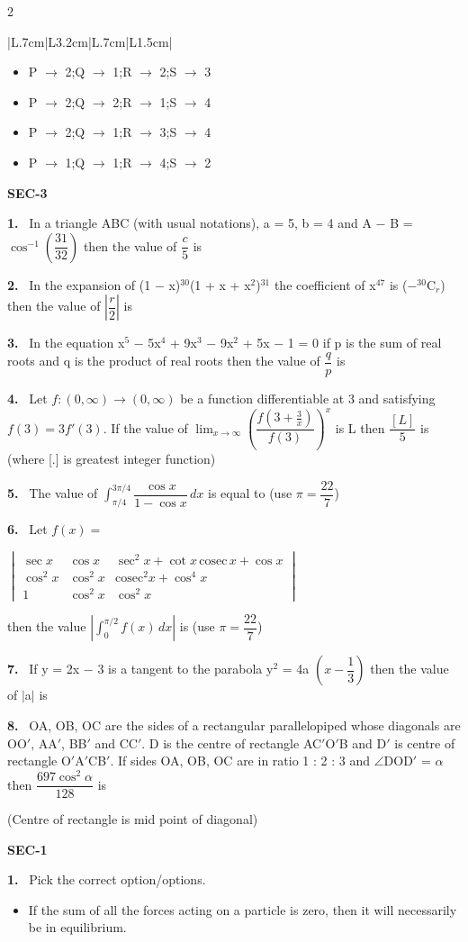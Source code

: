 \documentclass[10pt]{extarticle}
\newcommand{\papersec}[1]{\par\bigskip{\centering\Large\bfseries PAPER-#1\par}\medskip}
\newcommand{\partsec}[2]{\par\medskip\noindent{\large\bfseries PART-#1: #2}\par\smallskip}
\newcommand{\sect}[1]{\par\smallskip\noindent\textbf{#1}\par}
\newcommand{\qn}[1]{\par\smallskip\noindent\textbf{#1.}~}
\newenvironment{qoptions}{\begin{itemize}[leftmargin=1.8em,itemsep=1pt,topsep=2pt,label={}]}{\end{itemize}}
\newcommand{\opt}[2]{\item[(#1)] #2}
\begin{document}
\begin{multicols}{2}
{\begin{tabular}{|L{.7cm}|L{3.2cm}|L{.7cm}|L{1.5cm}|}
\end{tabular}}\par
\begin{qoptions}
\opt{A}{P $\to$ 2;Q $\to$ 1;R $\to$ 2;S $\to$ 3}
\opt{B}{P $\to$ 2;Q $\to$ 2;R $\to$ 1;S $\to$ 4}
\opt{C}{P $\to$ 2;Q $\to$ 1;R $\to$ 3;S $\to$ 4}
\opt{D}{P $\to$ 1;Q $\to$ 1;R $\to$ 4;S $\to$ 2}
\end{qoptions}
\sect{SEC-3}
\qn{1} In a triangle ABC (with usual notations), a = 5, b = 4 and A $-$ B = $\cos^{-1}\left(\dfrac{31}{32}\right)$ then the value of $\dfrac{c}{5}$ is
\qn{2} In the expansion of (1 $-$ x)$^{30}$(1 + x + x$^2$)$^{31}$ the coefficient of x$^{47}$ is ($-^{30}$C$_r$) then the value of $\left|\dfrac{r}{2}\right|$ is
\qn{3} In the equation x$^5$ $-$ 5x$^4$ + 9x$^3$ $-$ 9x$^2$ + 5x $-$ 1 = 0 if p is the sum of real roots and q is the product of real roots then the value of $\dfrac{q}{p}$ is
\qn{4} Let $f : (0, \infty) \to (0, \infty)$ be a function differentiable at 3 and satisfying $f(3) = 3f'(3)$. If the value of $\displaystyle\lim_{x \to \infty}\left(\dfrac{f\left(3 + \frac{3}{x}\right)}{f(3)}\right)^x$ is L then $\dfrac{[L]}{5}$ is (where [.] is greatest integer function)
\qn{5} The value of $\displaystyle\int_{\pi/4}^{3\pi/4}\dfrac{\cos x}{1 - \cos x}\,dx$ is equal to (use $\pi = \dfrac{22}{7}$)
\qn{6} Let $f(x) =$\par{\scriptsize$\begin{vmatrix} \sec x & \cos x & \sec^2 x + \cot x\,\mathrm{cosec}\,x + \cos x\\ \cos^2 x & \cos^2 x & \mathrm{cosec}^2 x + \cos^4 x\\ 1 & \cos^2 x & \cos^2 x \end{vmatrix}$}\par then the value $\left|\displaystyle\int_0^{\pi/2} f(x)\,dx\right|$ is (use $\pi = \dfrac{22}{7}$)
\qn{7} If y = 2x $-$ 3 is a tangent to the parabola y$^2$ = 4a $\left(x - \dfrac{1}{3}\right)$ then the value of $|$a$|$ is
\qn{8} OA, OB, OC are the sides of a rectangular parallelopiped whose diagonals are OO$'$, AA$'$, BB$'$ and CC$'$. D is the centre of rectangle AC$'$O$'$B and D$'$ is centre of rectangle O$'$A$'$CB$'$. If sides OA, OB, OC are in ratio 1 : 2 : 3 and $\angle$DOD$'$ = $\alpha$ then $\dfrac{697\cos^2\alpha}{128}$ is\par
(Centre of rectangle is mid point of diagonal)
\raggedcolumns
\papersec{2}
\partsec{1}{PHYSICS}
\sect{SEC-1}
\qn{1} Pick the correct option/options.
\begin{qoptions}
\opt{A}{If the sum of all the forces acting on a particle is zero, then it will necessarily be in equilibrium.}

\end{qoptions}
\end{multicols}
\end{document}
